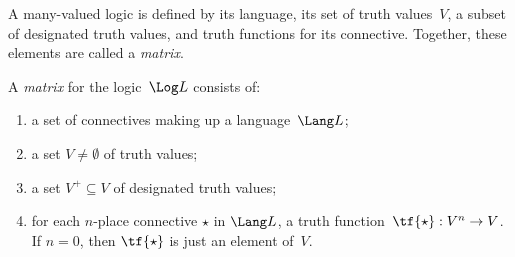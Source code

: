 \documentclass[../../../include/open-logic-section]{subfiles}
\begin{document}


A many-valued logic is defined by its language, its set of truth
values~$V$, a subset of designated truth values, and truth functions
for its connective.  Together, these elements are called a \emph{matrix}.  

\begin{defn}[Matrix]
A \emph{matrix} for the logic~$\Log L$ consists of:
\begin{enumerate}
\item a set of connectives making up a language~$\Lang L$;
\item a set $V \neq \emptyset$ of truth values;
\item a set $V^+ \subseteq V$ of designated truth values;
\item for each $n$-place connective $\star$ in $\Lang L$, a truth
function~$\tf{\star} : V^n \to V$. If $n = 0$, then $\tf{\star}$ is
just an element of~$V$.
\end{enumerate}
\end{defn}
\end{document}
